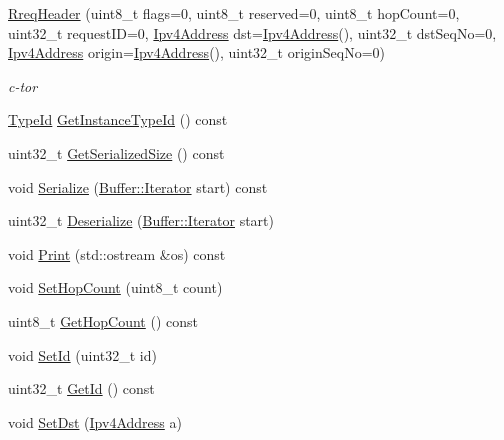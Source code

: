 \begin{DoxyCompactItemize}
\item 
\hyperlink{classns3_1_1aodv_1_1RreqHeader_a39dad09498d4fed06f4177ca6054ba38}{Rreq\+Header} (uint8\+\_\+t flags=0, uint8\+\_\+t reserved=0, uint8\+\_\+t hop\+Count=0, uint32\+\_\+t request\+ID=0, \hyperlink{classns3_1_1Ipv4Address}{Ipv4\+Address} dst=\hyperlink{classns3_1_1Ipv4Address}{Ipv4\+Address}(), uint32\+\_\+t dst\+Seq\+No=0, \hyperlink{classns3_1_1Ipv4Address}{Ipv4\+Address} origin=\hyperlink{classns3_1_1Ipv4Address}{Ipv4\+Address}(), uint32\+\_\+t origin\+Seq\+No=0)
\begin{DoxyCompactList}\small\item\em c-\/tor \end{DoxyCompactList}\item 
\hyperlink{classns3_1_1TypeId}{Type\+Id} \hyperlink{classns3_1_1aodv_1_1RreqHeader_adf3a31d99cf25f68bc2ba30a6ac03d0a}{Get\+Instance\+Type\+Id} () const 
\item 
uint32\+\_\+t \hyperlink{classns3_1_1aodv_1_1RreqHeader_a7fc9a95569c973ddc27d56ecdcfe97c9}{Get\+Serialized\+Size} () const 
\item 
void \hyperlink{classns3_1_1aodv_1_1RreqHeader_a574ecf6e7ec0e1d498ddfd1f4471ad97}{Serialize} (\hyperlink{classns3_1_1Buffer_1_1Iterator}{Buffer\+::\+Iterator} start) const 
\item 
uint32\+\_\+t \hyperlink{classns3_1_1aodv_1_1RreqHeader_a088f14d7f2fc75ee53fb03b689fc9443}{Deserialize} (\hyperlink{classns3_1_1Buffer_1_1Iterator}{Buffer\+::\+Iterator} start)
\item 
void \hyperlink{classns3_1_1aodv_1_1RreqHeader_a06ec46a808477efdb2d07470b7eb8942}{Print} (std\+::ostream \&os) const 
\item 
void \hyperlink{classns3_1_1aodv_1_1RreqHeader_a8b57a6c94c65cfbf4b490d294dac9c16}{Set\+Hop\+Count} (uint8\+\_\+t count)
\item 
uint8\+\_\+t \hyperlink{classns3_1_1aodv_1_1RreqHeader_ae77ac890448e0cdc5e26e724e6191cb7}{Get\+Hop\+Count} () const 
\item 
void \hyperlink{classns3_1_1aodv_1_1RreqHeader_a1d7752e07c61cf2864d47d216f33c5a6}{Set\+Id} (uint32\+\_\+t id)
\item 
uint32\+\_\+t \hyperlink{classns3_1_1aodv_1_1RreqHeader_ab5da9d295221e33c81fcee3b2f4f7534}{Get\+Id} () const 
\item 
void \hyperlink{classns3_1_1aodv_1_1RreqHeader_a015ab18a9dc655771f5b92b70bb2b0af}{Set\+Dst} (\hyperlink{classns3_1_1Ipv4Address}{Ipv4\+Address} a)
\item 

\end{DoxyCompactItemize}
